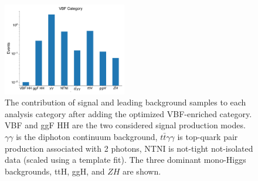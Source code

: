 \begin{figure}[p!]
  \includegraphics[width=0.48\textwidth]{chapters/chapter6_vbf/images/category_breakdown/vbfcat.pdf}
  \caption[The contribution of signal and leading background samples to each analysis category after adding the optimized VBF-enriched category]{The contribution of signal and leading background samples to each analysis category after adding the optimized VBF-enriched category. VBF and ggF HH are the two considered signal production modes. $\gamma \gamma$ is the diphoton continuum background, $t\bar{t}\gamma\gamma$ is top-quark pair production associated with 2 photons, NTNI is not-tight not-isolated data (scaled using a template fit).  The three dominant mono-Higgs backgrounds, ttH, ggH, and $ZH$ are shown.}
  \label{fig:category-yields}
\end{figure}


